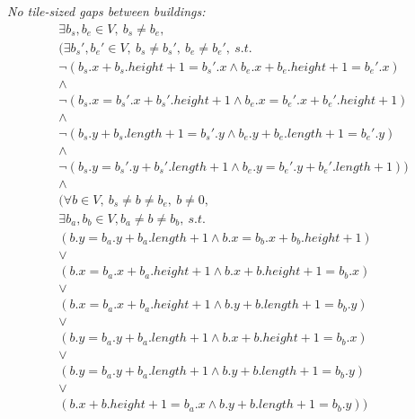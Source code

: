 \documentclass[a4paper,11pt]{article}
\begin{document}
\noindent
{\em  No tile-sized gaps  between buildings:}
\begin{displaymath}
  \begin{array}{l}
    \exists b_s, b_e \in V,\ b_s \neq b_e,\\
    \Big( \exists b_s', b_e' \in V,\ b_s \neq b_s',\ b_e \neq b_e',\ s.t.\\
    \lnot \left( b_s.x + b_s.height + 1 = b_s'.x \land b_e.x + b_e.height + 1
      = b_e'.x \right)\\
    \land\\
    \lnot \left( b_s.x = b_s'.x +  b_s'.height + 1 \land b_e.x = b_e'.x
      + b_e'.height + 1 \right)\\
    \land\\
    \lnot \left( b_s.y + b_s.length + 1 = b_s'.y \land b_e.y + b_e.length + 1
      = b_e'.y \right)\\
    \land\\
    \lnot \left( b_s.y = b_s'.y +  b_s'.length + 1 \land b_e.y = b_e'.y
      + b_e'.length + 1 \right) \Big)\\
    \land\\
    \Big( \forall b \in V,\ b_s \neq b \neq b_e,\ b \neq 0,\\
    \exists b_a, b_b \in V, b_a \neq b \neq b_b,\ s.t.\\
    \left( b.y = b_a.y + b_a.length + 1 \land b.x = b_b.x +
      b_b.height + 1 \right)\\
    \lor\\
    \left( b.x  = b_a.x + b_a.height  + 1 \land  b.x + b.height +  1 =
      b_b.x \right)\\ 
    \lor\\
    \left( b.x  = b_a.x + b_a.height  + 1 \land  b.y + b.length +  1 =
      b_b.y \right)\\ 
    \lor\\
    \left( b.y  = b_a.y + b_a.length  + 1 \land  b.x + b.height +  1 =
      b_b.x \right)\\ 
    \lor\\
    \left( b.y  = b_a.y + b_a.length  + 1 \land  b.y + b.length +  1 =
      b_b.y \right)\\ 
    \lor\\
    \left( b.x + b.height + 1 = b_a.x \land b.y + b.length + 1 = b_b.y
    \right) \Big) 
  \end{array}
\end{displaymath}
\end{document}

